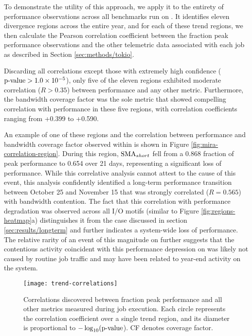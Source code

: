 To demonstrate the utility of this approach, we apply it to the entirety of performance observations across all benchmarks run on \mira.
It identifies eleven divergence regions across the entire year, and for each of these trend regions, we then calculate the Pearson correlation coefficient between the fraction peak performance observations and the other telemetric data associated with each job as described in Section \ref{sec:methods/tokio}.

Discarding all correlations except those with extremely high confidence ($\textup{p-value} > {1.0 \times 10^{-5}}$), only five of the eleven regions exhibited moderate correlation ($R > 0.35$) between performance and any other metric.
Furthermore, the bandwidth coverage factor was the sole metric that showed compelling correlation with performance in these five regions, with correlation coefficients ranging from +0.399 to +0.590.

An example of one of these regions and the correlation between performance and bandwidth coverage factor observed within is shown in Figure \ref{fig:mira-correlation-region}.
During this region, $\textup{SMA}_{short}$ fell from a 0.868 fraction of peak performance to 0.654 over 21 days, representing a significant loss of performance.
While this correlative analysis cannot attest to the cause of this event, this analysis confidently identified a long-term performance transition between October 25 and November 15 that was strongly correlated ($R = 0.565$) with bandwidth contention.
The fact that this correlation with performance degradation was observed across all I/O motifs (similar to Figure \ref{fig:regions-heatmap}a) distinguishes it from the case discussed in section \ref{sec:results/longterm} and further indicates a system-wide loss of performance.
The relative rarity of an event of this magnitude on \mira further suggests that the contentious activity coincident with this performance depression on \mira was likely not caused by routine job traffic and may have been related to year-end activity on the system.

\begin{figure}
    \centering
    \texttt{[image: trend-correlations]}
    \vspace{-.35in}
    \caption{Correlations discovered between fraction peak performance and all other metrics measured during job execution.
    Each circle represents the correlation coefficient over a single trend region, and its diameter is proportional to $-\log_{10}(\textup{p-value}$).
    CF denotes coverage factor.}
    \label{fig:trend-correlations}
\end{figure}



